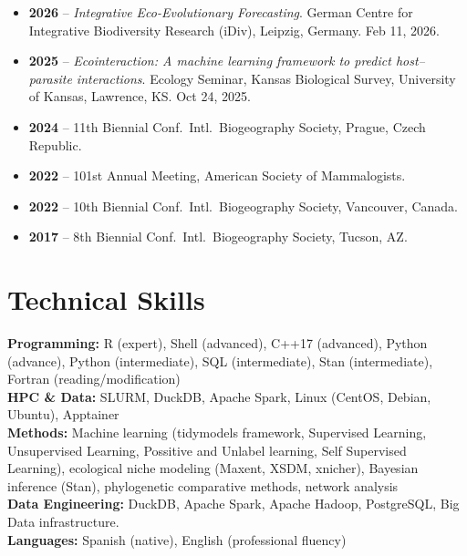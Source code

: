\documentclass[11pt,a4paper]{article}
\begin{document}
\begin{itemize}[leftmargin=0pt]
\item \textbf{2026} -- \textit{Integrative Eco-Evolutionary Forecasting}. German Centre for Integrative Biodiversity Research (iDiv), Leipzig, Germany. Feb 11, 2026.
\item \textbf{2025} -- \textit{Ecointeraction: A machine learning framework to predict host--parasite interactions}. Ecology Seminar, Kansas Biological Survey, University of Kansas, Lawrence, KS. Oct 24, 2025.
\item \textbf{2024} -- 11th Biennial Conf.\ Intl.\ Biogeography Society, Prague, Czech Republic.
\item \textbf{2022} -- 101st Annual Meeting, American Society of Mammalogists.
\item \textbf{2022} -- 10th Biennial Conf.\ Intl.\ Biogeography Society, Vancouver, Canada.
\item \textbf{2017} -- 8th Biennial Conf.\ Intl.\ Biogeography Society, Tucson, AZ.
\end{itemize}



\section*{Technical Skills}

\textbf{Programming:} R (expert), Shell (advanced), C++17 (advanced), Python (advance), Python (intermediate), SQL (intermediate), Stan (intermediate), 
Fortran (reading/modification)\\
\textbf{HPC \& Data:} SLURM, DuckDB, Apache Spark, Linux (CentOS, Debian, Ubuntu), Apptainer \\
\textbf{Methods:} Machine learning (tidymodels framework, Supervised Learning, Unsupervised Learning, Possitive and Unlabel learning, Self Supervised Learning), ecological niche modeling (Maxent, XSDM, xnicher), Bayesian inference (Stan), phylogenetic comparative methods, network analysis\\
\textbf{Data Engineering:} DuckDB, Apache Spark, Apache Hadoop, PostgreSQL, Big Data infrastructure. \\
\textbf{Languages:} Spanish (native), English (professional fluency)
\end{document}
